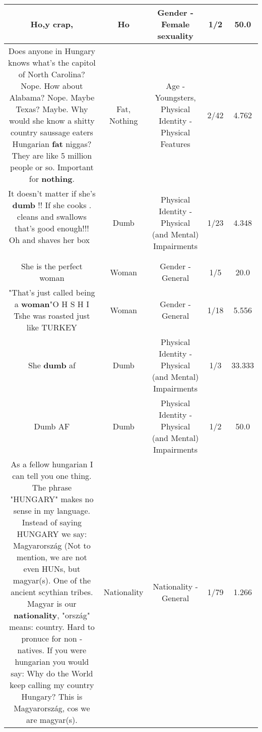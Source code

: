 \documentclass[11pt]{article}
\newlength\mylength
\begin{document}
\begin{center}
\begin{longtable}{|C{.65\mylength}|C{.30\mylength}|C{.12\mylength}|C{.12\mylength}|C{.12\mylength}|}
  \small Ho,y crap,\normalsize   & Ho & Gender - Female sexuality & 1/2 & 50.0 \\  \hline
  \small Does anyone in Hungary knows what's the capitol of North Carolina? Nope. How about Alabama? Nope. Maybe Texas? Maybe. Why would she know a shitty country saussage eaters Hungarian \textbf{fat} niggas? They are like 5 million people or so. Important for \textbf{nothing}.\normalsize   & Fat, Nothing & Age - Youngsters, Physical Identity - Physical Features & 2/42 & 4.762 \\  \hline
  \small It doesn't matter if she's \textbf{dumb} !! If she cooks . cleans and swallows that's good enough!!! Oh and shaves her box 👅👅👅👄💋👄💋\normalsize   & Dumb & Physical Identity - Physical (and Mental) Impairments & 1/23 & 4.348 \\  \hline
  \small She is the perfect woman\normalsize   & Woman & Gender - General & 1/5 & 20.0 \\  \hline
  \small "That's just called being a \textbf{woman}"O H  S H I Tshe was roasted just like TURKEY\normalsize   & Woman & Gender - General & 1/18 & 5.556 \\  \hline
  \small She \textbf{dumb} af\normalsize   & Dumb & Physical Identity - Physical (and Mental) Impairments & 1/3 & 33.333 \\  \hline
  \small Dumb AF\normalsize   & Dumb & Physical Identity - Physical (and Mental) Impairments & 1/2 & 50.0 \\  \hline
  \small As a fellow hungarian I can tell you one thing. The phrase "HUNGARY" makes no sense in my language. Instead of saying HUNGARY we say: Magyarország (Not to mention, we are not even HUNs, but magyar(s). One of the ancient scythian tribes. Magyar is our \textbf{nationality}, "ország" means: country. Hard to pronuce for non - natives. If you were hungarian you would say: Why do the World keep calling my country Hungary? This is Magyarország, cos we are magyar(s).\normalsize   & Nationality & Nationality - General & 1/79 & 1.266 \\  \hline

\end{longtable}
\end{center}
\end{document}
